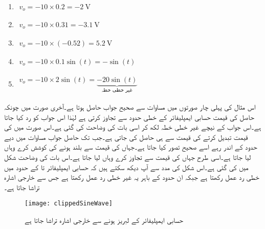 \begin{enumerate}
\item
$\begin{aligned}
v_o = -10 \times 0.2 = \SI{-2}{\volt}
\end{aligned}$

\item
$\begin{aligned}
v_o = -10 \times 0.31 = \SI{-3.1}{\volt}
\end{aligned}$

\item
$\begin{aligned}
v_o = -10 \times \left(-0.52 \right ) = \SI{5.2}{\volt}
\end{aligned}$

\item
$\begin{aligned}
v_o = -10 \times 0.1 \sin (t) = - \sin(t) 
\end{aligned}$

\item
$\begin{aligned}
v_o = -10 \times 2 \sin(t)=\underbrace{-20 \sin(t)}_{\text{غیر خطی خطہ}}
\end{aligned}$
\end{enumerate}

		اس مثال کی پہلی چار صورتوں میں مساوات   سے صحیح جواب حاصل ہوتا ہے۔آخری صورت میں چونکہ حاصل  کی قیمت حسابی ایمپلیفائر کے خطی حدود سے تجاوز کرتی ہے لہٰذا اس جواب کو رد کیا جاتا ہے۔اس جواب کے نیچے غیر خطی خطہ لکھ کر اسی بات کی وضاحت کی گئی ہے۔اس صورت میں  کی قیمت تبدیل کرتے  کی قیمت  سے ہی حاصل کی جاتی ہے۔جب تک حاصل جواب مساوات   میں دیے حدود کے اندر رہے اسے صحیح تصور کیا جاتا ہے۔جہاں   کی قیمت سے بلند ہونے کی کوشش کرے وہاں  لیا جاتا ہے۔اسی طرح جہاں  کی قیمت  سے تجاوز کرے وہاں  لیا جاتا ہے۔اس بات کی وضاحت شکل  میں کی گئی ہے۔اس شکل کی مدد سے آپ دیکھ سکتے ہیں کہ حسابی ایمپلیفائر  تا  کے حدود میں خطی رد عمل رکھتا ہے جبکہ ان حدود کے باہر یہ غیر خطی رد عمل رکھتا ہے جس سے خارجی اشارہ  تراشا جاتا ہے۔
\begin{figure}
\centering
\texttt{[image: clippedSineWave]}
\caption{حسابی ایمپلیفائر کے لبریز ہونے سے خارجی اشارہ  تراشا جاتا ہے}
\label{شکل_حسابی_لبریز}
\end{figure}

